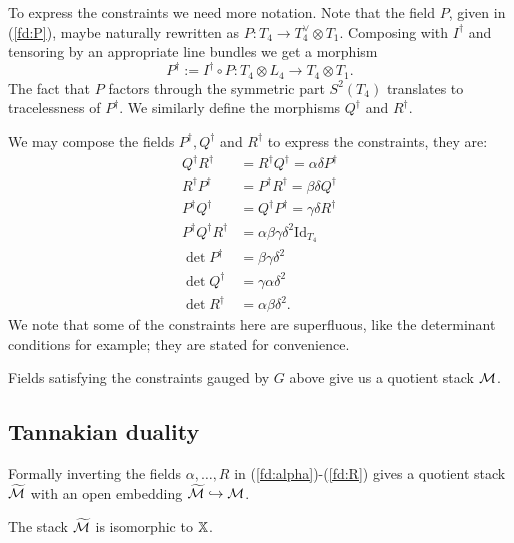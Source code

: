 \documentclass{amsart}
\theoremstyle{definition}
\begin{document}
To express the constraints we need more notation.
Note that the field $P$, given in (\ref{fd:P}), maybe naturally rewritten as $P \colon T_4 \rightarrow T_4^\vee \otimes T_1$.
Composing with $I^\dagger$ and tensoring by an appropriate line bundles we get a morphism $$P^\dagger:= I^\dagger \circ P \colon T_4 \otimes L_4 \rightarrow T_4 \otimes T_1.$$
The fact that $P$ factors through the symmetric part $S^2(T_4)$ translates to tracelessness of $P^\dagger$.
We similarly define the morphisms $Q^\dagger$ and $R^\dagger$.

We may compose the fields $P^\dagger,Q^\dagger$ and $R^\dagger$ to express the constraints, they
are:
\begin{align}
    Q^\dagger R^\dagger &= R^\dagger Q^\dagger = \alpha \delta P^\dagger \label{con:qr} \\
    R^\dagger P^\dagger &= P^\dagger R^\dagger = \beta \delta Q^\dagger \label{con:rp} \\
    P^\dagger Q^\dagger &= Q^\dagger P^\dagger = \gamma \delta R^\dagger \label{con:pq} \\
    P^\dagger Q^\dagger R^\dagger &= \alpha \beta \gamma \delta^2 \text{Id}_{T_4} \label{con:pqr} \\
    \det P^\dagger &= \beta \gamma \delta^2 \\
    \det Q^\dagger &= \gamma \alpha \delta^2 \\
    \det R^\dagger &= \alpha \beta \delta^2.
\end{align}
We note that some of the constraints here are superfluous, like the determinant conditions for example; they are stated for convenience.

Fields satisfying the constraints gauged by $G$ above give us a quotient stack $\mathcal{M}$.

\subsection{Tannakian duality}

Formally inverting the fields $\alpha, \ldots, R$ in (\ref{fd:alpha})-(\ref{fd:R}) gives a quotient stack $\widetilde{\mathcal{M}}$ with an open embedding $\widetilde{\mathcal{M}} \hookrightarrow \mathcal{M}$.

\begin{proposition}\label{prop:tannaka}
The stack $\widetilde{\mathcal{M}}$ is isomorphic to $\mathbb{X}$.
\end{proposition}
\end{document}
